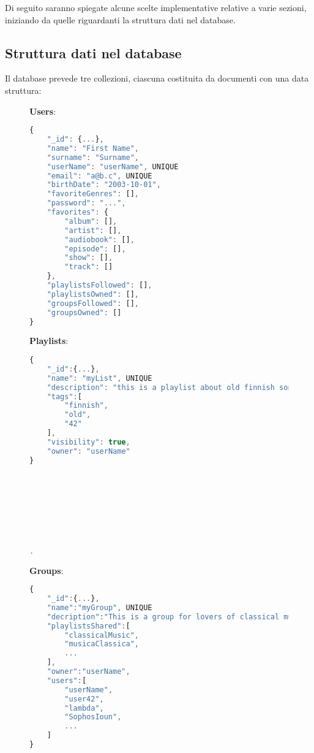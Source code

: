 Di seguito saranno spiegate alcune scelte implementative relative a varie sezioni, iniziando da quelle riguardanti la struttura dati nel database.
\subsection{Struttura dati nel database}
Il database prevede tre collezioni, ciascuna costituita da documenti con una data struttura:
\begin{figure}[h]
    \begin{minipage}{.30\textwidth}
        \textbf{Users}:

        \begin{lstlisting}[language=JavaScript]
{
    "_id": {...},
    "name": "First Name",
    "surname": "Surname",
    "userName": "userName", UNIQUE
    "email": "a@b.c", UNIQUE
    "birthDate": "2003-10-01",
    "favoriteGenres": [],
    "password": "...",
    "favorites": {
        "album": [],
        "artist": [],
        "audiobook": [],
        "episode": [],
        "show": [],
        "track": []
    },
    "playlistsFollowed": [],
    "playlistsOwned": [],
    "groupsFollowed": [],
    "groupsOwned": []
}
        \end{lstlisting}
    \end{minipage}
    \hfill
    \begin{minipage}{.30\textwidth}
        \textbf{Playlists}:

        \begin{lstlisting}[language=JavaScript]
{
    "_id":{...},
    "name": "myList", UNIQUE
    "description": "this is a playlist about old finnish songs",
    "tags":[
        "finnish",
        "old",
        "42"
    ],
    "visibility": true,
    "owner": "userName"
}








.
        \end{lstlisting}
    \end{minipage}
    \hfill
    \begin{minipage}{.30\textwidth}
        \textbf{Groups}:

        \begin{lstlisting}[language=JavaScript]
{
    "_id":{...},
    "name":"myGroup", UNIQUE
    "decription":"This is a group for lovers of classical music. Join this group to gain access to more than 15 playlists!",
    "playlistsShared":[
        "classicalMusic",
        "musicaClassica",
        ...
    ],
    "owner":"userName",
    "users":[
        "userName",
        "user42",
        "lambda",
        "SophosIoun",
        ...
    ]
}

        \end{lstlisting}
    \end{minipage}
\end{figure}
